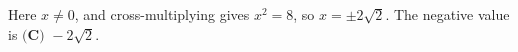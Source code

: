 Here $x\ne0$, and cross-multiplying gives $x^2=8$, so $x=\pm2\sqrt2$. The negative value is $\boxed{\textbf{(C) }-2\sqrt2}$.
